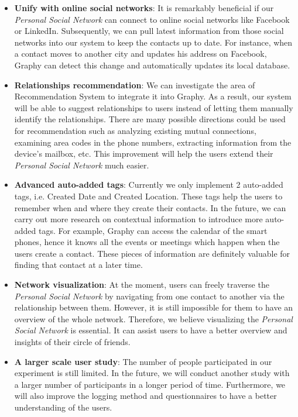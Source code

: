 \begin{itemize}
    \item {\textbf{Unify with online social networks}: It is remarkably beneficial if our \textit{Personal Social Network} can connect to online social networks like Facebook or LinkedIn. Subsequently, we can pull latest information from those social networks into our system to keep the contacts up to date. For instance, when a contact moves to another city and updates his address on Facebook, Graphy can detect this change and automatically updates its local database.}
    \item {\textbf{Relationships recommendation}: We can investigate the area of Recommendation System to integrate it into Graphy. As a result, our system will be able to suggest relationships to users instead of letting them manually identify the relationships. There are many possible directions could be used for recommendation such as analyzing existing mutual connections, examining area codes in the phone numbers, extracting information from the device's mailbox, etc. This improvement will help the users extend their \textit{Personal Social Network} much easier.} 
    \item {\textbf{Advanced auto-added tags}: Currently we only implement 2 auto-added tags, i.e. Created Date and Created Location. These tags help the users to remember when and where they create their contacts. In the future, we can carry out more research on contextual information to introduce more auto-added tags. For example, Graphy can access the calendar of the smart phones, hence it knows all the events or meetings which happen when the users create a contact. These pieces of information are definitely valuable for finding that contact at a later time.}
    \item {\textbf{Network visualization}: At the moment, users can freely traverse the \textit{Personal Social Network} by navigating from one contact to another via the relationship between them. However, it is still impossible for them to have an overview of the whole network. Therefore, we believe visualizing the \textit{Personal Social Network} is essential. It can assist users to have a better overview and insights of their circle of friends.}
    \item {\textbf{A larger scale user study}: The number of people participated in our experiment is still limited. In the future, we will conduct another study with a larger number of participants in a longer period of time. Furthermore, we will also improve the logging method and questionnaires to have a better understanding of the users.}

\end{itemize}


